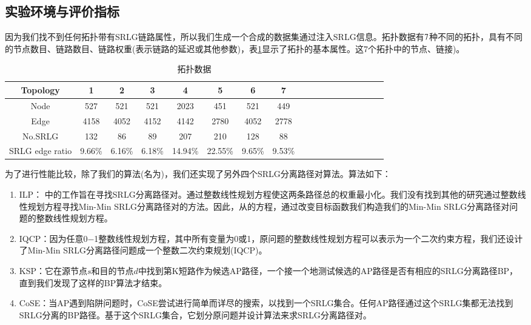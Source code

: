 
\subsection{实验环境与评价指标}

因为我们找不到任何拓扑带有SRLG链路属性，所以我们生成一个合成的数据集通过注入SRLG信息。拓扑数据有$7$种不同的拓扑，具有不同的节点数目、链路数目、链路权重(表示链路的延迟或其他参数)，表\ref{tab:AllSample}显示了拓扑的基本属性。这7个拓扑中的节点、链接)。

\begin{table}[htbp]
\caption{拓扑数据}
  \centering
\footnotesize{  \begin{tabular}{*{18}{c}}
\toprule
Topology & 1 & 2 & 3 & 4 & 5 & 6& 7   \\
\midrule
Node    &     527&      521    &      521     &    2023             &     451     &     521     &     449       \\
Edge   &    4158 &  4052     &    4152      &   4142          &       2780   &      4052   &      2778    \\
No.SRLG & 132 &  86   &  89  &  207        & 210  &  128  &   88    \\
SRLG edge ratio & 9.66\% & 6.16\% &   6.18\% &   14.94\%    &   22.55\%  &  9.65\% &   9.53\%     \\
\bottomrule
\end{tabular}
}
\label{tab:AllSample}
\end{table}

为了进行性能比较，除了我们的算法(名为\CI)，我们还实现了另外四个SRLG分离路径对算法。算法如下：
\begin{enumerate}
  \item ILP：\cite{hu2003diverse} 中的工作旨在寻找SRLG分离路径对。通过整数线性规划方程使这两条路径总的权重最小化。我们没有找到其他的研究通过整数线性规划方程寻找Min-Min SRLG分离路径对的方法。因此，从\cite{hu2003diverse}的方程，通过改变目标函数我们构造我们的Min-Min SRLG分离路径对问题的整数线性规划方程。
  \item IQCP：因为任意0−1整数线性规划方程，其中所有变量为0或1，原问题的整数线性规划方程可以表示为一个二次约束方程，我们还设计了Min-Min SRLG分离路径问题成一个整数二次约束规划(IQCP)\cite{hu2003diverse}。
  \item KSP\cite{eppstein1998finding}：它在源节点$s$和目的节点$d$中找到第K短路作为候选AP路径，一个接一个地测试候选的AP路径是否有相应的SRLG分离路径BP，直到我们发现了这样的BP算法才结束。
  \item CoSE\cite{rostami2007cose}：当AP遇到陷阱问题时，CoSE尝试进行简单而详尽的搜索，以找到一个SRLG集合。任何AP路径通过这个SRLG集都无法找到SRLG分离的BP路径。基于这个SRLG集合，它划分原问题并设计算法来求SRLG分离路径对。
\end{enumerate}


